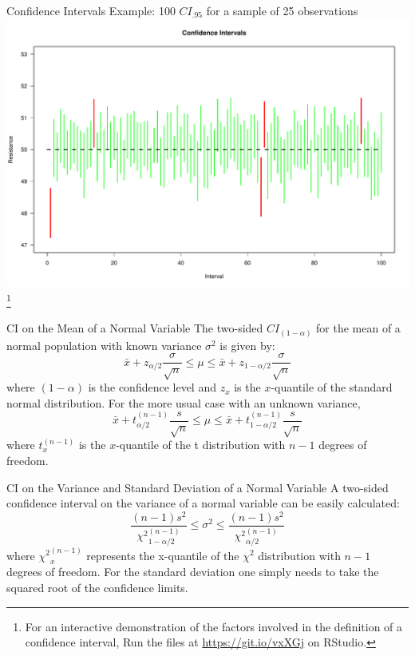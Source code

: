 
\begin{frame}
{Confidence Intervals}
{Example: 100 $CI_{.95}$ for a sample of 25 observations}
\centering\includegraphics[width=.8\textwidth]{../img/CIs.pdf}
\footnote{For an interactive demonstration of the factors involved in the definition of a confidence interval, Run the files at \url{https://git.io/vxXGj} on RStudio.}
\end{frame}


\begin{frame}{CI on the Mean of a Normal Variable}
The two-sided $CI_{(1-\alpha)}$ for the mean of a normal population with known variance $\sigma^2$ is given by:
\begin{equation*}
\bar{x}+z_{\alpha/2}\frac{\sigma}{\sqrt{n}}\leq\mu\leq\bar{x}+z_{1-\alpha/2}\frac{\sigma}{\sqrt{n}}
\end{equation*}
\noindent where $(1-\alpha)$ is the confidence level and $z_{x}$ is the $x$-quantile of the standard normal distribution.
\bigskip
For the more usual case with an unknown variance,
\begin{equation*}
\bar{x}+t_{\alpha/2}^{(n-1)}\frac{s}{\sqrt{n}}\leq\mu\leq\bar{x}+t_{1-\alpha/2}^{(n-1)}\frac{s}{\sqrt{n}}
\end{equation*}
\noindent where $t_{x}^{(n-1)}$ is the $x$-quantile of the t distribution with $n-1$ degrees of freedom.
\end{frame}


\begin{frame}{CI on the Variance and Standard Deviation of a Normal Variable}
A two-sided confidence interval on the variance of a normal variable can be easily calculated:
\begin{equation*}
\frac{(n-1)s^2}{{\chi^2}_{1 - \alpha/2}^{(n-1)}}\leq\sigma^2\leq\frac{(n-1)s^2}{{\chi^2}_{\alpha/2}^{(n-1)}}
\end{equation*}
\noindent where ${\chi^2}_{x}^{(n-1)}$ represents the x-quantile of the $\chi^2$ distribution with $n-1$ degrees of freedom. For the standard deviation one simply needs to take the squared root of the confidence limits.
\end{frame}

